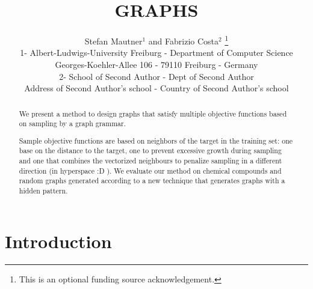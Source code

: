\documentclass{esannV2}
\begin{document}
\title{GRAPHS}
\author{Stefan Mautner$^1$ and Fabrizio Costa$^2$
%
\thanks{This is an optional funding source acknowledgement.}
%
\vspace{.3cm}\\
%
1- Albert-Ludwigs-University Freiburg  - Department of Computer Science \\
Georges-Koehler-Allee 106  - 79110 Freiburg - Germany
\vspace{.1cm}\\
2- School of Second Author - Dept of Second Author \\
Address of Second Author's school - Country of Second Author's school\\
}
\maketitle






\begin{abstract}

We present a method to design graphs that satisfy multiple objective 
functions based on sampling by a graph grammar.
    
    Sample objective functions are based on neighbors of the target
in the training set: one base on the distance to the target, one to prevent
excessive growth during sampling and one that combines the vectorized neighbours
to penalize sampling in a different direction (in hyperspace :D ).
 We evaluate our method
on chemical compounds and random graphs generated according to a new technique
that generates graphs with a hidden pattern.

\end{abstract}

\section{Introduction}
\end{document}
